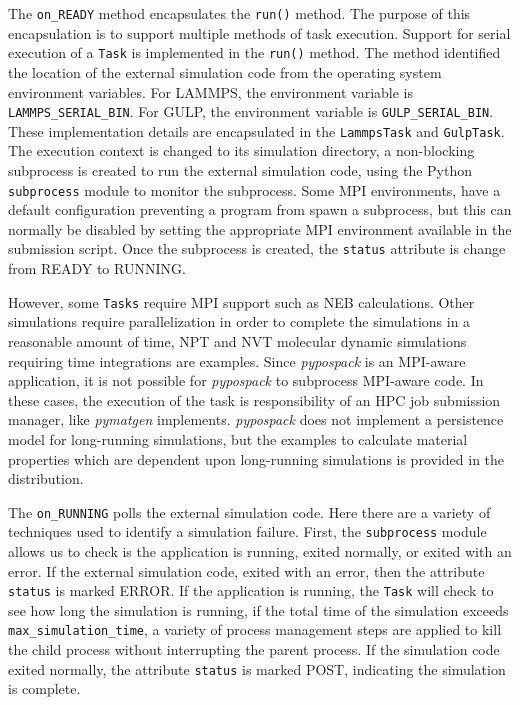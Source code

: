 The \verb|on_READY| method encapsulates the \verb|run()| method.  The purpose of this encapsulation is to support multiple methods of task execution.  Support for serial execution of a \verb|Task| is implemented in the \verb|run()| method.  The method identified the location of the external simulation code from the operating system environment variables.  For LAMMPS, the environment variable is \verb|LAMMPS_SERIAL_BIN|.  For GULP, the environment variable is \verb|GULP_SERIAL_BIN|.  These implementation details are encapsulated in the \verb|LammpsTask| and \verb|GulpTask|.  The execution context is changed to its simulation directory, a non-blocking subprocess is created to run the external simulation code, using the Python \verb|subprocess| module to monitor the subprocess.  Some MPI environments, have a default configuration preventing a program from spawn a subprocess, but this can normally be disabled by setting the appropriate MPI environment available in the submission script.  Once the subprocess is created, the \verb|status| attribute is change from READY to RUNNING.

However, some \verb|Tasks| require MPI support such as NEB calculations.  Other simulations require parallelization in order to complete the simulations in a reasonable amount of time,  NPT and NVT molecular dynamic simulations requiring time integrations are examples.
Since \emph{pypospack} is an MPI-aware application, it is not possible for \emph{pypospack} to subprocess MPI-aware code.  In these cases, the execution of the task is responsibility of an HPC job submission manager, like \emph{pymatgen} implements.  \emph{pypospack} does not implement a persistence model for long-running simulations, but the examples to calculate material properties which are dependent upon long-running simulations is provided in the distribution.

The \verb|on_RUNNING| polls the external simulation code.  Here there are a variety of techniques used to identify a simulation failure.  First, the \verb|subprocess| module allows us to check is the application is running, exited normally, or exited with an error.  If the external simulation code, exited with an error, then the attribute \verb|status| is marked ERROR.    If the application is running, the \verb|Task| will check to see how long the simulation is running, if the total time of the simulation exceeds \verb|max_simulation_time|, a variety of process management steps are applied to kill the child process without interrupting the parent process.  If the simulation code exited normally, the attribute \verb|status| is marked POST, indicating the simulation is complete.

